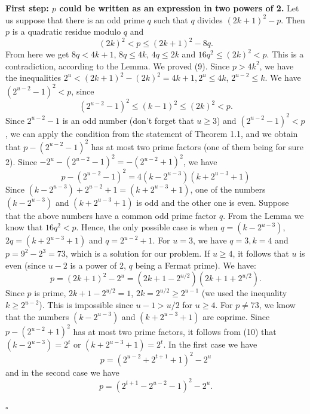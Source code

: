 \documentclass[12pt]{article}
\newenvironment{proof}{{\it Proof.}}{\hfill $ \square $ \vskip 4mm}
\begin{document}
{\begin{proof} {\bf First step: $p$ could be written as an expression in two powers of 2.}
Let us suppose that there is an odd prime $q$ such that $q$ divides $(2k+1)^2-p$. Then $p$ is a quadratic residue modulo $q$ and 
$$(2k)^2<p\leq (2k+1)^2-8q.$$
From here we get $8q<4k+1$, $8q\leq 4k$, $4q\leq 2k$ and $16q^2\leq (2k)^2<p$. This is a contradiction, according to the Lemma. We proved (9). Since $p>4k^2$, we have the inequalities $2^u<(2k+1)^2-(2k)^2=4k+1, 2^u\leq 4k$, $2^{u-2}\leq k$. We have $(2^{u-2}-1)^2<p$, since $$(2^{u-2}-1)^2\leq (k-1)^2\leq (2k)^2<p.$$
Since $2^{u-2}-1$ is an odd number (don't forget that $u\geq 3$) and $(2^{u-2}-1)^2<p$, we can apply the condition from the statement of Theorem 1.1, and we obtain that $p-(2^{u-2}-1)^2$ has at most two prime factors (one of them being for sure 2). Since $-2^u-(2^{u-2}-1)^2=-(2^{u-2}+1)^2$, we have 
\begin{equation}
p-(2^{u-2}-1)^2=4(k-2^{u-3})(k+2^{u-3}+1)
\end{equation}
Since $(k-2^{u-3})+2^{u-2}+1=(k+2^{u-3}+1)$, one of the numbers $(k-2^{u-3})$ and $(k+2^{u-3}+1)$ is odd and the other one is even. Suppose that the above numbers have a common odd prime factor $q$. From the Lemma we know that $16q^2<p$. Hence, the only possible case is when $q=(k-2^{u-3})$, $2q=(k+2^{u-3}+1)$ and $q=2^{u-2}+1$.
For $u=3$, we have $q=3,k=4$ and $p=9^2-2^3=73$, which is a solution for our problem. If $u\geq 4$, it follows that $u$ is even (since $u-2$ is a power of 2, $q$ being a Fermat prime). We have:
$$p=(2k+1)^2-2^u=(2k+1-2^{u/2})(2k+1+2^{u/2}).$$ Since $p$ is prime, $2k+1-2^{u/2}=1$, $2k=2^{u/2}\geq 2^{u-1}$ (we used the inequality $k\geq 2^{u-2}$). This is impossible since $u-1>u/2$ for $u\geq 4$.
For $p\neq 73$, we know that the numbers $(k-2^{u-3})$ and $(k+2^{u-3}+1)$ are coprime. Since $p-(2^{u-2}+1)^2$ has at most two prime factors, it follows from (10) that $(k-2^{u-3})=2^t$ or $(k+2^{u-3}+1)=2^t$. In the first case we have 
\begin{equation}
p=(2^{u-2}+2^{t+1}+1)^2-2^u
\end{equation}
and in the second case we have
\begin{equation}
p=(2^{t+1}-2^{u-2}-1)^2-2^u.
\end{equation}


\end{proof}}
\end{document}
